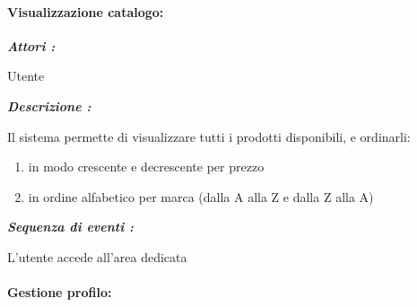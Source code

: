 \documentclass{article}
\begin{document}
\newpage

\paragraph{Visualizzazione catalogo:}

\begin{mdframed}
	\noindent\textit{\textbf{Attori :}}


	Utente

	\noindent\textit{\textbf{Descrizione :}}


	Il sistema permette di visualizzare tutti i prodotti disponibili, e ordinarli:
	\begin{enumerate}
		\item in modo crescente e decrescente per prezzo
		\item in ordine alfabetico per marca (dalla A alla Z e dalla Z alla A)
	\end{enumerate}

	\noindent\textit{\textbf{Sequenza di eventi :}}


	L’utente accede all'area dedicata

\end{mdframed}

\paragraph{Gestione profilo:}
\end{document}
